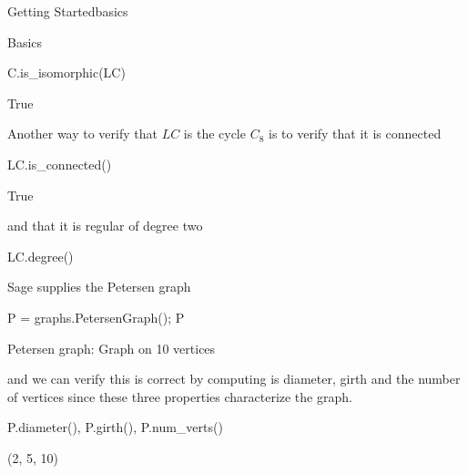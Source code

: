 \begin{chap}{Getting Started}{basics}
\begin{sect}{Basics}
\begin{sagecode}
\begin{sageinput}
C.is_isomorphic(LC)
\end{sageinput}
\begin{sageoutput}
True
\end{sageoutput}
\end{sagecode}
%
\begin{para}
Another way to verify that $LC$ is the cycle $C_8$ is to verify that it
is connected
\end{para}
%
\begin{sagecode}
\begin{sageinput}
LC.is_connected()
\end{sageinput}
\begin{sageoutput}
True
\end{sageoutput}
\end{sagecode}
%
\begin{para}
and that it is regular of degree two
\end{para}
%
\begin{sagecode}
\begin{sageinput}
LC.degree()
\end{sageinput}
\begin{sageoutput}
[2, 2, 2, 2, 2, 2, 2, 2]
\end{sageoutput}
\end{sagecode}
%
\begin{para}
Sage supplies the Petersen graph
\end{para}
%
\begin{sagecode}
\begin{sageinput}
P = graphs.PetersenGraph(); P
\end{sageinput}
\begin{sageoutput}
Petersen graph: Graph on 10 vertices
\end{sageoutput}
\end{sagecode}
%
\begin{para}
and we can verify this is correct by computing is diameter, girth
and the number of vertices since these three properties characterize the graph.
\end{para}
%
\begin{sagecode}
\begin{sageinput}
P.diameter(), P.girth(), P.num_verts()
\end{sageinput}
\begin{sageoutput}
(2, 5, 10)   
\end{sageoutput}
\end{sagecode}
%
\begin{para}

\end{para}
\end{sect}
\end{chap}
